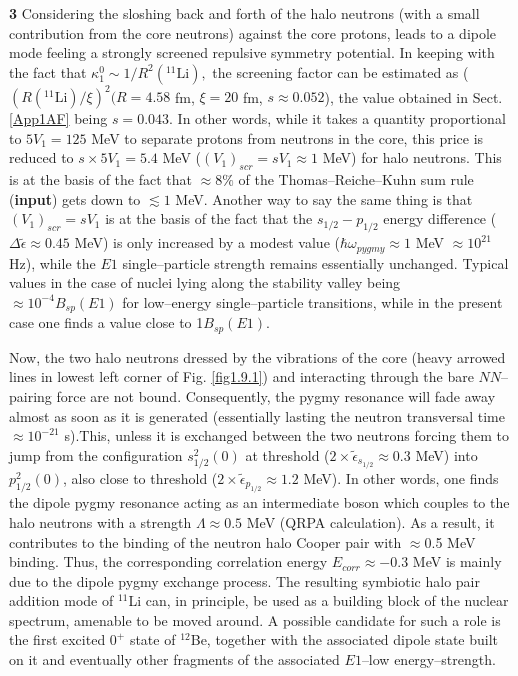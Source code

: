 \textbf{3} Considering the sloshing back and forth of the halo neutrons (with a small contribution from the core neutrons) against the core protons, leads to a dipole mode feeling a strongly screened repulsive symmetry potential. In keeping with the fact that $\kappa_1^0\sim1/R^2(^{11}\text{Li}),$ the screening factor can be estimated as ($(R(^{11}\text{Li})/\xi)^2(R=4.58$  fm, $\xi=20$ fm, $s\approx0.052$), the value obtained in Sect. \ref{App1AF} being $s=0.043$. In other words, while it takes  a quantity proportional to $5V_1=125$ MeV to separate protons from neutrons in the core, this price is reduced to $s\times 5 V_1=5.4$ MeV ($(V_1)_{scr}=sV_1\approx1$ MeV) for halo neutrons. This is at the basis of the fact that $\approx 8\%$ of the Thomas--Reiche--Kuhn sum rule (\textbf{input}) gets down to $\lesssim 1$ MeV. Another way to say the same thing is that $(V_1)_{scr}=sV_1$ is at the basis of the fact that the $s_{1/2}- p_{1/2}$ energy difference ($\Delta \tilde\epsilon\approx 0.45$ MeV) is only increased by a modest value ($\hbar \omega_{pygmy}\approx 1$ MeV $\approx 10^{21}$ Hz), while the $E1$  single--particle strength remains essentially unchanged. Typical values in the case of nuclei lying along the stability valley being $\approx 10^{-4} B_{sp} (E1)$ for  low--energy  single--particle transitions, while in the present case one finds a value close to 1$B_{sp}(E1)$. 


Now, the two halo neutrons dressed by the vibrations of the core (heavy arrowed lines in lowest left corner of Fig. \ref{fig1.9.1}) and interacting through the bare $NN$--pairing force are not bound. Consequently, the pygmy resonance will fade away almost as soon as it is generated (essentially lasting the neutron transversal time $\approx 10^{-21}$ s).This, unless it is exchanged between the two neutrons forcing them to jump from the configuration $s^{2}_{1/2}(0)$ at threshold ($2\times\tilde\epsilon_{s_{1/2}}\approx 0.3$ MeV) into  $p^2_{1/2}(0)$, also close to threshold     ($2\times\tilde\epsilon_{p_{1/2}}\approx 1.2$ MeV). In other words, one finds the dipole pygmy resonance acting as an intermediate boson which  couples to the halo neutrons with a  strength $\Lambda\approx 0.5$ MeV (QRPA calculation). As a result, it contributes to the binding of the neutron halo Cooper pair with $\approx$0.5 MeV binding. Thus, the corresponding correlation energy $E_{corr}\approx-0.3$ MeV is mainly due to the dipole pygmy exchange process. The resulting symbiotic halo pair addition mode of $^{11}$Li can, in principle, be used as a building block of the nuclear spectrum, amenable to  be moved around. A possible candidate for such a role is the first excited $0^+$ state of $^{12}$Be, together with the associated dipole state built on it and eventually other fragments of the associated $E1$--low energy--strength.


